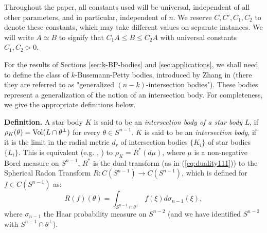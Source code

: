 \documentclass[12pt,oneside]{amsart}
\theoremstyle{definition}
\theoremstyle{remark}
\theoremstyle{proof}
\numberwithin{equation}{section}
\newcommand{\Vol}[1]{\textnormal{Vol} (#1)}
\newcommand{\definition}[1]{\medskip\noindent\textbf{Definition.}#1\medskip}
\begin{document}
Throughout the paper, all constants used will be universal,
independent of all other parameters, and in particular,
independent of $n$. We reserve $C,C',C_1,C_2$ to denote these
constants, which may take different values on separate instances.
We will write $A \simeq B$ to signify that $C_1 A \leq B \leq C_2
A$ with universal constants $C_1,C_2>0$.

\medskip

For the results of Sections \ref{sec:k-BP-bodies} and
\ref{sec:applications}, we shall need to define the class of
$k$-Busemann-Petty bodies, introduced by Zhang in
\cite{Zhang-Gen-BP} (there they are referred to as "generalized
$(n-k)$-intersection bodies"). These bodies represent a
generalization of the notion of an intersection body. For
completeness, we give the appropriate definitions below.


\definition{
A star body $K$ is said to be an
\emph{intersection body of a star body} $L$, if $\rho_K(\theta) =
\Vol{L \cap \theta^\perp}$ for every $\theta \in S^{n-1}$.
$K$ is said to be an \emph{intersection body}, if it is the limit
in the radial metric $d_r$ of intersection bodies $\{K_i\}$ of
star bodies $\{L_i\}$. This is equivalent (e.g.
\cite{Lutwak-intersection-bodies}, \cite{Gardner-BP-5dim}) to
$\rho_K = R^*(d\mu)$, where $\mu$ is a non-negative Borel measure
on $S^{n-1}$, $R^*$ is the dual transform (as in
(\ref{eq:duality111})) to the Spherical Radon Transform
$R:C(S^{n-1}) \rightarrow C(S^{n-1})$, which is defined for $f\in
C(S^{n-1})$ as:
\[
R(f)(\theta) = \int_{S^{n-1} \cap \theta^\perp} f(\xi)
d\sigma_{n-1}(\xi),
\]
where $\sigma_{n-1}$ the Haar probability measure on $S^{n-2}$
(and we have identified $S^{n-2}$ with $S^{n-1} \cap
\theta^\perp$).
}
\end{document}
